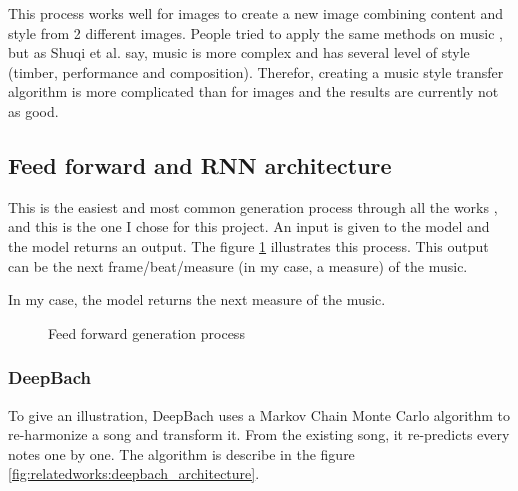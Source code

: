 \documentclass[12pt]{report}
\begin{document}
This process works well for images to create a new image combining content and style from 2 different images.
People tried to apply the same methods on music \cite{kaliakatsos-papakostas_conceptual_2017, hung_musical_2019, brunner_symbolic_2018, lu_play_2018}, but as Shuqi et al. \cite{dai_music_2018} say, music is more complex and has several level of style (timber, performance and composition).
Therefor, creating a music style transfer algorithm is more complicated than for images and the results are currently not as good.

\subsection{Feed forward and RNN architecture}

This is the easiest and most common generation process through all the works \cite{liang_automatic_2017, chuan_modeling_nodate, huang_counterpoint_2017, wu_hierarchical_2018}, and this is the one I chose for this project.
An input is given to the model and the model returns an output.
The figure \ref{fig:feed_forward_generation_process} illustrates this process.
This output can be the next frame/beat/measure (in my case, a measure) of the music.

In my case, the model returns the next measure of the music.

\begin{figure}[h]
\begin{center}
\caption{Feed forward generation process}
\label{fig:feed_forward_generation_process}
\end{center}
\end{figure}

\subsubsection{DeepBach}

To give an illustration, DeepBach \cite{hadjeres_deepbach:_2016} uses a Markov Chain Monte Carlo algorithm to re-harmonize a song and transform it. 
From the existing song, it re-predicts every notes one by one.
The algorithm is describe in the figure \ref{fig:relatedworks:deepbach_architecture}.
\end{document}
